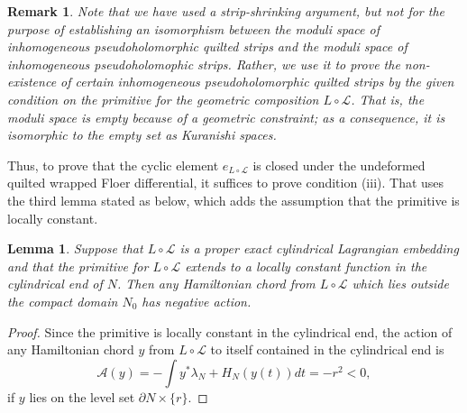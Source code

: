 \documentclass{amsart}
\newtheorem{lemma}[theorem]{Lemma}
\newtheorem{remark}[theorem]{Remark}
\numberwithin{equation}{section}
\numberwithin{figure}{section}
\begin{document}
\begin{remark}
	Note that we have used a strip-shrinking argument, but not for the purpose of establishing an isomorphism between the moduli space of inhomogeneous pseudoholomorphic quilted strips and the moduli space of inhomogeneous pseudoholomophic strips. Rather, we use it to prove the non-existence of certain inhomogeneous pseudoholomorphic quilted strips by the given condition on the primitive for the geometric composition $L \circ \mathcal{L}$. 
That is, the moduli space is empty because of a geometric constraint; as a consequence, it is isomorphic to the empty set as Kuranishi spaces.
\end{remark}

	Thus, to prove that the cyclic element $e_{L \circ \mathcal{L}}$ is closed under the undeformed quilted wrapped Floer differential, it suffices to prove condition (iii). That uses the third lemma stated as below, which adds the assumption that the primitive is locally constant. \par

\begin{lemma}
	Suppose that $L \circ \mathcal{L}$ is a proper exact cylindrical Lagrangian embedding and that the primitive for $L \circ \mathcal{L}$ extends to a locally constant function in the cylindrical end of $N$. Then any Hamiltonian chord from $L \circ \mathcal{L}$ which lies outside the compact domain $N_{0}$ has negative action.
\end{lemma}
\begin{proof}
	 Since the primitive is locally constant in the cylindrical end, the action of any Hamiltonian chord $y$ from $L \circ \mathcal{L}$ to itself contained in the cylindrical end is
\begin{equation*}
\mathcal{A}(y) = - \int y^{*} \lambda_{N} + H_{N}(y(t))dt = -r^{2} < 0,
\end{equation*}
if $y$ lies on the level set $\partial N \times \{r\}$.
\end{proof}
\end{document}
